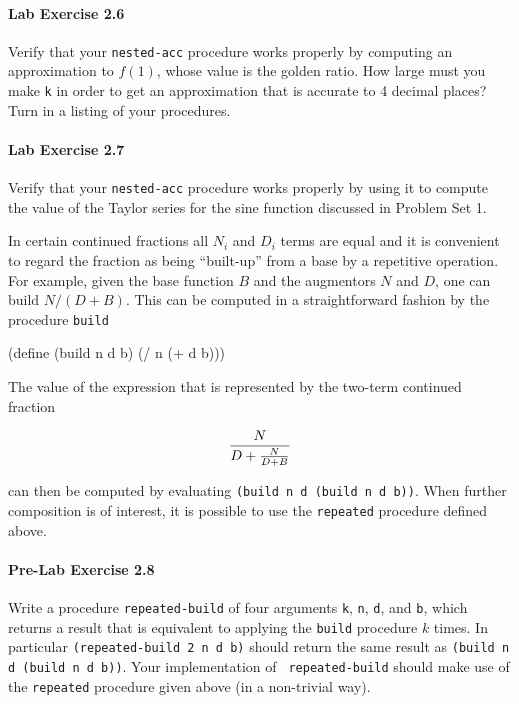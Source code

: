 \paragraph{Lab Exercise 2.6}

Verify that your {\tt nested-acc} procedure works properly
by computing an approximation to $f(1)$, whose value is
the golden ratio. How large must you make {\tt k}
in order to get an approximation that is accurate to 4 decimal places?
Turn in a listing of your procedures.

\paragraph{Lab Exercise 2.7}
Verify that your {\tt nested-acc} procedure works
properly by using it to compute the value of the Taylor series for the
sine function discussed in Problem Set 1.

In certain continued fractions all $N_i$ and $D_i$ terms are equal
and it is convenient to regard the fraction as
being ``built-up'' from a base by a repetitive operation. For
example, given the base function $B$ and the augmentors
$N$ and $D$, one can build $N/(D+B)$. This can be computed in a
straightforward fashion by the procedure {\tt build}

\beginlisp
(define (build n d b)
  (/ n (+ d b)))
\endlisp

The value of the expression that is represented by the two-term
continued fraction

\begin{displaymath}
{N \over {D+{N \over {D+B}}}}
\end{displaymath}

can then be computed by evaluating {\tt (build n d (build n d b))}.
When further composition is of interest, it is possible to use the
{\tt repeated} procedure defined above.

\paragraph{ Pre-Lab Exercise 2.8 }
Write a procedure {\tt repeated-build} of four arguments {\tt k},
{\tt n}, {\tt d}, and {\tt b}, which returns a result
that is equivalent to applying the {\tt build} procedure $k$ times. In
particular {\tt (repeated-build 2 n d b)} should return the same result
as  {\tt  (build  n  d  (build  n  d  b))}.  Your  implementation  of  {\tt
repeated-build} should make use of the {\tt repeated} procedure given above
(in a non-trivial way).

